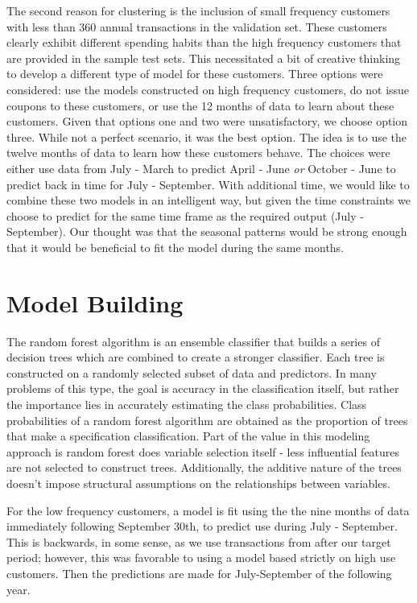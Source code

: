 \documentclass[12pt]{article} %
\begin{document}
The second reason for clustering is the inclusion of small frequency customers with less than 360 annual transactions in the validation set.  These customers clearly exhibit different spending habits than the high frequency customers that are provided in the sample test sets.  This necessitated a bit of creative thinking to develop a different type of model for these customers.  Three options were considered: use the models constructed on high frequency customers, do not issue coupons to these customers, or use the 12 months of data to learn about these customers.  Given that options one and two were unsatisfactory, we choose option three.  While not a perfect scenario, it was the best option.   The idea is to use the twelve months of data to learn how these customers behave.  The choices were either use data from July - March to predict April - June \emph{or}  October - June to predict back in time for July - September.  With additional time, we would like to combine these two models in an intelligent way, but given the time constraints we choose to predict for the same time frame as the required output (July - September).  Our thought was that the seasonal patterns would be strong enough that it would be beneficial to fit the model during the same months.

\section{Model Building}
The random forest algorithm is an ensemble classifier that builds a series of decision trees which are combined to create a stronger classifier.  Each tree is constructed on a randomly selected subset of data and predictors.  In many problems of this type, the goal is accuracy in the classification itself, but rather the importance lies in accurately estimating the class probabilities.  Class probabilities of a random forest algorithm are obtained as the proportion of trees that make a specification classification.  Part of the value in this modeling approach is random forest does variable selection itself - less influential features are not selected to construct trees.  Additionally, the additive nature of the trees doesn't impose structural assumptions on the relationships between variables.

For the low frequency customers, a model is fit using the the nine months of data immediately following September 30th, to predict use during July - September.  This is backwards, in some sense, as we use transactions from after our target period; however, this was favorable to using a model based strictly on high use customers.  Then the predictions are made for July-September of the following year.
\end{document}
